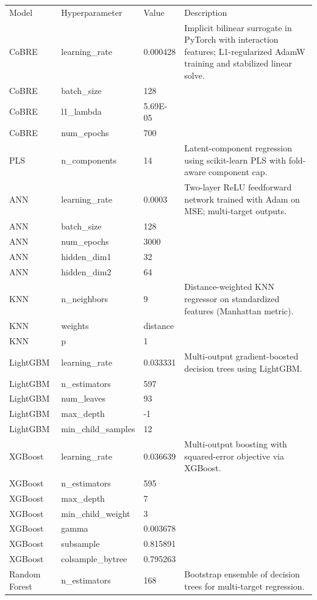 \documentclass{article}
\begin{document}
\begin{table}[h]
\centering
\scriptsize
\begin{tabular}{lll p{8cm}}
Model & Hyperparameter & Value & Description \\
CoBRE & learning\_rate & 0.000428 & Implicit bilinear surrogate in PyTorch with interaction features; L1-regularized AdamW training and stabilized linear solve. \\
CoBRE & batch\_size & 128 & \\
CoBRE & l1\_lambda & 5.69E-05 & \\
CoBRE & num\_epochs & 700 & \\
PLS & n\_components & 14 & Latent-component regression using scikit-learn PLS with fold-aware component cap. \\
ANN & learning\_rate & 0.0003 & Two-layer ReLU feedforward network trained with Adam on MSE; multi-target outputs. \\
ANN & batch\_size & 128 & \\
ANN & num\_epochs & 3000 & \\
ANN & hidden\_dim1 & 32 & \\
ANN & hidden\_dim2 & 64 & \\
KNN & n\_neighbors & 9 & Distance-weighted KNN regressor on standardized features (Manhattan metric). \\
KNN & weights & distance & \\
KNN & p & 1 & \\
LightGBM & learning\_rate & 0.033331 & Multi-output gradient-boosted decision trees using LightGBM. \\
LightGBM & n\_estimators & 597 & \\
LightGBM & num\_leaves & 93 & \\
LightGBM & max\_depth & -1 & \\
LightGBM & min\_child\_samples & 12 & \\
XGBoost & learning\_rate & 0.036639 & Multi-output boosting with squared-error objective via XGBoost. \\
XGBoost & n\_estimators & 595 & \\
XGBoost & max\_depth & 7 & \\
XGBoost & min\_child\_weight & 3 & \\
XGBoost & gamma & 0.003678 & \\
XGBoost & subsample & 0.815891 & \\
XGBoost & colsample\_bytree & 0.795263 & \\
Random Forest & n\_estimators & 168 & Bootstrap ensemble of decision trees for multi-target regression. \\

\end{tabular}
\end{table}
\end{document}
